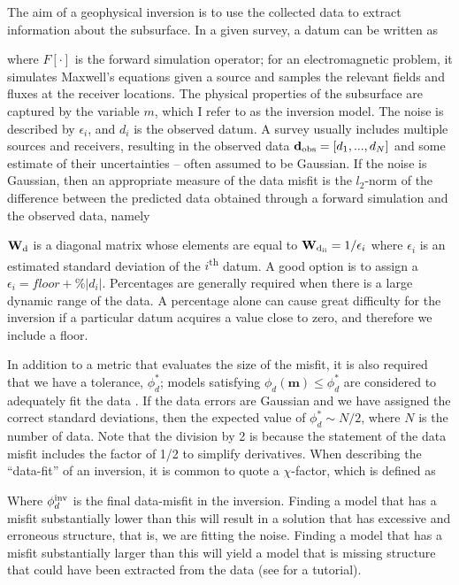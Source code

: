 The aim of a geophysical inversion is to use the collected data to extract information about the subsurface. In a given survey, a datum can be written as

where $F[\cdot]$ is the forward simulation operator; for an electromagnetic problem, it simulates Maxwell’s equations given a source and samples the relevant fields and fluxes at the receiver locations. The physical properties of the subsurface are captured by the variable $m$, which I refer to as the inversion model. The noise is described by $\epsilon_i$, and $d_i$ is the observed datum. A survey usually includes multiple sources and receivers, resulting in the observed data $\mathbf{d}_{\rm obs} = [d_1, ... , d_N]$ and some estimate of their uncertainties -- often assumed to be Gaussian. If the noise is Gaussian, then an appropriate measure of the data misfit is the $l_2$-norm of the difference between the predicted data obtained through a forward simulation and the observed data, namely

$\mathbf{W}_{\rm d}$ is a diagonal matrix whose elements are equal to $\mathbf{W}_{\rm d_{ii}}=1/\epsilon_i$ where $\epsilon_i$ is an estimated standard deviation of the $i$\textsuperscript{th} datum. A good option is to assign a $\epsilon_i = floor + \%|d_i|$.
Percentages are generally required when there is a large dynamic range of the data. A percentage alone can cause great difficulty for the inversion if a particular datum acquires a value close to zero, and therefore we include a floor.

In addition to a metric that evaluates the size of the misfit, it is also required that we have a tolerance, $\phi_d^*$; models satisfying $\phi_d(\mathbf{m}) \leq \phi_d^*$ are considered to adequately fit the data \citep{Parker1994}. If the data errors are Gaussian and we have assigned the correct standard deviations, then the expected value of $\phi_d^* \sim N/2$, where $N$ is the number of data. Note that the division by 2 is because the statement of the data misfit includes the factor of 1/2 to simplify derivatives. When describing the ``data-fit'' of an inversion, it is common to quote a $\chi$-factor, which is defined as

Where $\phi_d^{\rm inv}$ is the final data-misfit in the inversion.  Finding a model that has a misfit substantially lower than this will result in a solution that has excessive and erroneous structure, that is, we are fitting the noise. Finding a model that has a misfit substantially larger than this will yield a model that is missing structure that could have been extracted from the data (see \cite{Oldenburg2005} for a tutorial).

